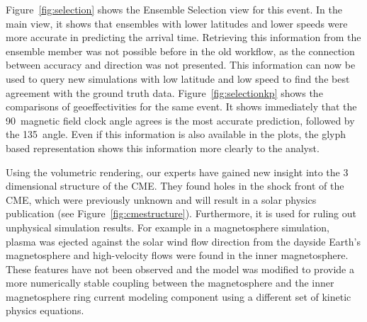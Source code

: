 \documentclass[journal]{vgtc}                %
\begin{document}
Figure~\ref{fig:selection} shows the Ensemble Selection view for this event. In the main view, it shows that ensembles with lower latitudes and lower speeds were more accurate in predicting the arrival time. Retrieving this information from the ensemble member was not possible before in the old workflow, as the connection between accuracy and direction was not presented. This information can now be used to query new simulations with low latitude and low speed to find the best agreement with the ground truth data. Figure~\ref{fig:selectionkp} shows the comparisons of geoeffectivities for the same event. It shows immediately that the 90\degree\ magnetic field clock angle agrees is the most accurate prediction, followed by the 135\degree\ angle. Even if this information is also available in the plots, the glyph based representation shows this information more clearly to the analyst.

Using the volumetric rendering, our experts have gained new insight into the 3 dimensional structure of the CME. They found holes in the shock front of the CME, which were previously unknown and will result in a solar physics publication (see Figure~\ref{fig:cmestructure}). Furthermore, it is used for ruling out unphysical simulation results. For example in a magnetosphere simulation, plasma was ejected against the solar wind flow direction from the dayside Earth's magnetosphere and high-velocity flows were found in the inner magnetosphere. These features have not been observed and the model was modified to provide a more numerically stable coupling between the magnetosphere and the inner magnetosphere ring current modeling component using a different set of kinetic physics equations.
\end{document}
